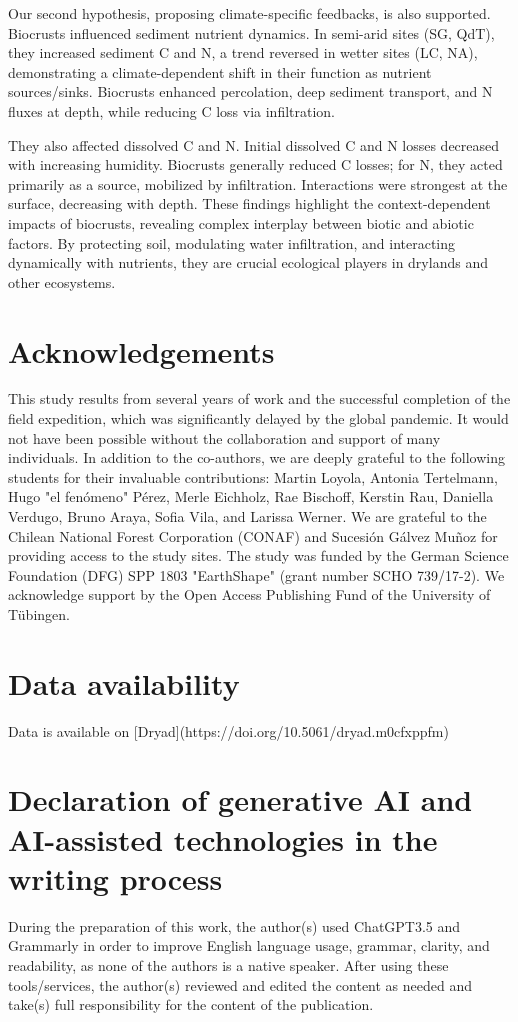 Our second hypothesis, proposing climate-specific feedbacks, is also supported. Biocrusts influenced sediment nutrient dynamics. In semi-arid sites (SG, QdT), they increased sediment C and N, a trend reversed in wetter sites (LC, NA), demonstrating a climate-dependent shift in their function as nutrient sources/sinks. Biocrusts enhanced percolation, deep sediment transport, and N fluxes at depth, while reducing C loss via infiltration.

They also affected dissolved C and N. Initial dissolved C and N losses decreased with increasing humidity. Biocrusts generally reduced C losses; for N, they acted primarily as a source, mobilized by infiltration. Interactions were strongest at the surface, decreasing with depth.
These findings highlight the context-dependent impacts of biocrusts, revealing complex interplay between biotic and abiotic factors. By protecting soil, modulating water infiltration, and interacting dynamically with nutrients, they are crucial ecological players in drylands and other ecosystems.

\section*{Acknowledgements}

This study results from several years of work and the successful completion of the field expedition, which was significantly delayed by the global pandemic. It would not have been possible without the collaboration and support of many individuals. In addition to the co-authors, we are deeply grateful to the following students for their invaluable contributions: Martin Loyola, Antonia Tertelmann, Hugo "el fenómeno" Pérez, Merle Eichholz, Rae Bischoff, Kerstin Rau, Daniella Verdugo, Bruno Araya, Sofia Vila, and Larissa Werner. We are grateful to the Chilean National Forest Corporation (CONAF) and Sucesión Gálvez Muñoz for providing access to the study sites. The study was funded by the German Science Foundation (DFG) SPP 1803 "EarthShape" (grant number SCHO 739/17-2). We acknowledge support by the Open Access Publishing Fund of the University of Tübingen.

\section*{Data availability}

Data is available on [Dryad](https://doi.org/10.5061/dryad.m0cfxppfm)

\section*{Declaration of generative AI and AI-assisted technologies in the writing process}

During the preparation of this work, the author(s) used ChatGPT3.5 and Grammarly in order to improve English language usage, grammar, clarity, and readability, as none of the authors is a native speaker. After using these tools/services, the author(s) reviewed and edited the content as needed and take(s) full responsibility for the content of the publication.



